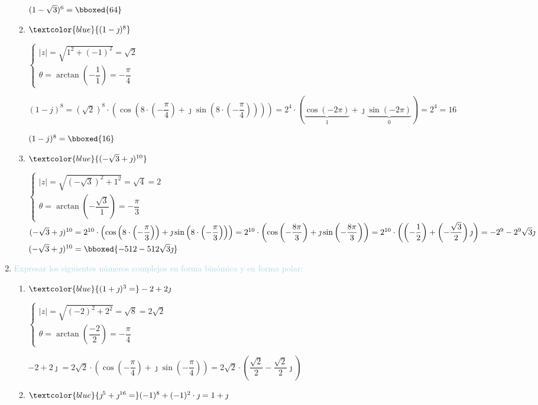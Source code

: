 \begin{enumerate}[label=\color{red}\textbf{\arabic*)}, leftmargin=*]
\begin{enumerate}[label=\color{red}\alph*)]
	$(1-\sqrt{3})^6=\bboxed{64}$
	\item $\textcolor{blue}{(1-\jmath)^8}$
	
	$\begin{cases}
		|z|=\sqrt{1^2+(-1)^2}=\sqrt{2}\\
		\theta=\arctan\left(-\dfrac{1}{1}\right)=-\dfrac{\pi}{4}
	\end{cases}$
	
	$(1-j)^8=(\sqrt{2})^8\cdot\left(\cos\left(8\cdot\left(-\dfrac{\pi}{4}\right)+\jmath\sin\left(8\cdot\left(-\dfrac{\pi}{4}\right)\right)\right)\right)=2^4\cdot(\underbrace{\cos(-2\pi)}_1+\jmath\underbrace{\sin(-2\pi)}_0)=2^4=16$
	
	$(1-j)^8=\bboxed{16}$
	\item $\textcolor{blue}{(-\sqrt{3}+\jmath)^{10}}$
	
	$\begin{cases}
		|z|=\sqrt{(-\sqrt{3})^2+1^2}=\sqrt{4}=2\\
		\theta=\arctan\left(-\dfrac{\sqrt{3}}{1}\right)=-\dfrac{\pi}{3}
	\end{cases}$\\
	$(-\sqrt{3}+\jmath)^{10}=2^{10}\cdot\left(\cos\left(8\cdot\left(-\dfrac{\pi}{3}\right)\right)+\jmath\sin\left(8\cdot\left(-\dfrac{\pi}{3}\right)\right)\right)=2^{10}\cdot\left(\cos\left(-\dfrac{8\pi}{3}\right)+\jmath\sin\left(-\dfrac{8\pi}{3}\right)\right)\linebreak=2^{10}\cdot\left(\left(-\dfrac{1}{2}\right)+\left(-\dfrac{\sqrt{3}}{2}\right)\jmath\right)=-2^9-2^9\sqrt{3}\jmath$\\
	$(-\sqrt{3}+\jmath)^{10}=\bboxed{-512-512\sqrt{3}\jmath}$
\end{enumerate}

\item \textcolor{lightblue}{Expresar los siguientes números complejos en forma binómica y en forma polar:}
\begin{enumerate}[label=\color{red}\alph*)]
	\item $\textcolor{blue}{(1+\jmath)^3=}-2+2\jmath$
	
	$\begin{cases}
		|z|=\sqrt{(-2)^2+2^2}=\sqrt{8}=2\sqrt{2}\\
		\theta=\arctan\left(\dfrac{-2}{2}\right)=-\dfrac{\pi}{4}
	\end{cases}$
	
	$-2+2\jmath=2\sqrt{2}\cdot\left(\cos\left(-\dfrac{\pi}{4}\right)+\jmath\sin\left(-\dfrac{\pi}{4}\right)\right)=2\sqrt{2}\cdot\left(\dfrac{\sqrt{2}}{2}-\dfrac{\sqrt{2}}{2}\jmath\right)$
	\item $\textcolor{blue}{\jmath^5+\jmath^{16}=}(-1)^8+(-1)^2\cdot\jmath=1+\jmath$
	

\end{enumerate}
\end{enumerate}

